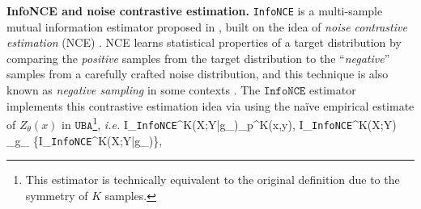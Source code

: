 \documentclass{article}
\theoremstyle{plain}
\theoremstyle{definition}
\theoremstyle{remark}
\newcommand{\infonce}{\texttt{InfoNCE}}
\newcommand{\UBA}{\texttt{UBA}}
\begin{document}
	
	{\bf InfoNCE and noise contrastive estimation.} \texttt{InfoNCE} is a multi-sample mutual information estimator proposed in \citep{oord2018representation}, built on the idea of {\it noise contrastive estimation} (NCE) \citep{gutmann2010noise}. 
	NCE learns statistical properties of a target distribution by comparing the {\it positive} samples from the target distribution to the ``{\it negative}'' samples from a carefully crafted noise distribution, and this technique is also known as {\it negative sampling} in some contexts \citep{mnih2013learning, grover2016node2vec}. 
	The $\infonce$ estimator implements this contrastive estimation idea via using the na\"ive empirical estimate of $Z_{\theta}(x)$ in $\UBA$\footnote{This estimator is technically equivalent to the original definition due to the symmetry of $K$ samples.}, {\it i.e.}
	\beq
	\label{eq:infonce}
	I_{\infonce}^K(X;Y|g_{\theta})\triangleq \EE_{p^K(x,y)}, I_{\infonce}^K(X;Y) \triangleq \max_{g_{\theta}\in \CF} \{I_{\infonce}^K(X;Y|g_{\theta})\}, 
	\eeq
\end{document}
